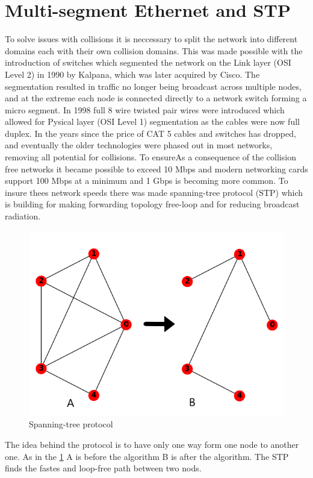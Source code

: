 \section{Multi-segment Ethernet and STP}

To solve issues with collisions it is neccessary to split the network into different domains each with their own collision domains. This was made possible with the introduction of switches which segmented the network on the Link layer (OSI Level 2) in 1990 by Kalpana, which was later acquired by Cisco. The segmentation resulted in traffic no longer being broadcast across multiple nodes, and at the extreme each node is connected directly to a network switch forming a micro segment. In 1998 full 8 wire twisted pair wires were introduced which allowed for Pysical layer (OSI Level 1) segmentation as the cables were now full duplex. In the years since the price of CAT 5 cables and switches has dropped, and eventually the older technologies were phased out in most networks, removing all potential for collisions. To ensureAs a consequence of the collision free networks it became possible to exceed 10 Mbps and modern networking cards support 100 Mbps at a minimum and 1 Gbps is becoming more common. To insure thees network speeds there was made spanning-tree protocol (STP) which is building for making forwarding topology free-loop and for reducing broadcast radiation. 
\begin{figure}[h!]\label{}
	\centering
	\includegraphics[scale=0.5]{realTimeEthernet/Image/STP.png}
	\caption{Spanning-tree protocol}
	\label{fig:STP}
\end{figure}

The idea behind the protocol is to have only one way form one node to another one. As in the \ref{fig:STP} A is before the algorithm B is after the algorithm. The STP finds the fastes and loop-free path between two nods.
